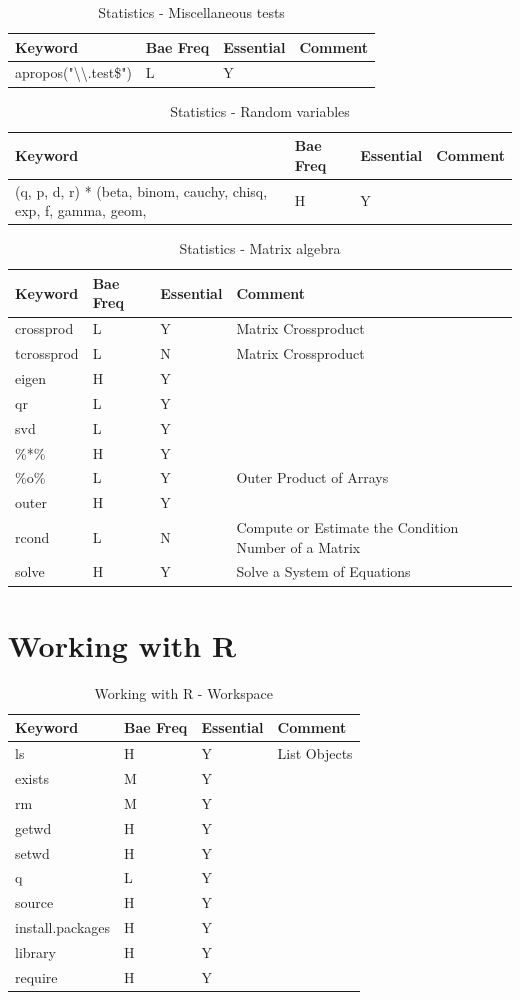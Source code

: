 \documentclass[11pt,]{krantz}
\theoremstyle{definition}
\theoremstyle{definition}
\theoremstyle{remark}
\begin{document}
\begin{longtable}[t]{llll}
\caption{\label{tab:knitchunk18}Statistics - Miscellaneous tests}\\
\toprule
Keyword & Bae Freq & Essential & Comment\\
\midrule
apropos("\textbackslash{}\textbackslash{}.test\$") & L & Y & \\
\bottomrule
\end{longtable}

\begin{longtable}[t]{llll}
\caption{\label{tab:knitchunk19}Statistics - Random variables }\\
\toprule
Keyword & Bae Freq & Essential & Comment\\
\midrule
(q, p, d, r) * (beta, binom, cauchy, chisq, exp, f, gamma, geom, & H & Y & \\
\bottomrule
\end{longtable}

\begin{longtable}[t]{llll}
\caption{\label{tab:knitchunk20}Statistics - Matrix algebra }\\
\toprule
Keyword & Bae Freq & Essential & Comment\\
\midrule
crossprod & L & Y & Matrix Crossproduct\\
tcrossprod & L & N & Matrix Crossproduct\\
eigen & H & Y & \\
qr & L & Y & \\
svd & L & Y & \\
\addlinespace
\%*\% & H & Y & \\
\%o\% & L & Y & Outer Product of Arrays\\
outer & H & Y & \\
rcond & L & N & Compute or Estimate the Condition Number of a Matrix\\
solve & H & Y & Solve a System of Equations\\
\bottomrule
\end{longtable}

\section{Working with R}\label{working-with-r}

\begin{longtable}[t]{llll}
\caption{\label{tab:knitchunk21}Working with R - Workspace }\\
\toprule
Keyword & Bae Freq & Essential & Comment\\
\midrule
ls & H & Y & List Objects\\
exists & M & Y & \\
rm & M & Y & \\
getwd & H & Y & \\
setwd & H & Y & \\
\addlinespace
q & L & Y & \\
source & H & Y & \\
install.packages & H & Y & \\
library & H & Y & \\
require & H & Y & \\
\bottomrule
\end{longtable}
\end{document}
